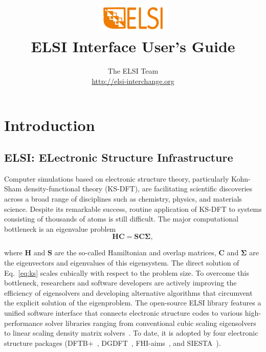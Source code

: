 \documentclass{report}
\begin{document}
\title{\includegraphics[scale=0.07]{elsi_logo.png}\\ \vspace{0.5cm} \textbf{ELSI Interface User's Guide}}
\author{The ELSI Team\\ \url{http://elsi-interchange.org}}
\maketitle

\tableofcontents

\chapter{Introduction}
\section{ELSI: ELectronic Structure Infrastructure}
\label{sec:elsi}
Computer simulations based on electronic structure theory, particularly Kohn-Sham density-functional theory (KS-DFT), are facilitating scientific discoveries across a broad range of disciplines such as chemistry, physics, and materials science. Despite its remarkable success, routine application of KS-DFT to systems consisting of thousands of atoms is still difficult. The major computational bottleneck is an eigenvalue problem
\begin{equation}
\label{eq:ks}
\boldsymbol{H} \boldsymbol{C} = \boldsymbol{S} \boldsymbol{C} \boldsymbol{\Sigma},
\end{equation}

where $\boldsymbol{H}$ and $\boldsymbol{S}$ are the so-called Hamiltonian and overlap matrices, $\boldsymbol{C}$ and $\boldsymbol{\Sigma}$ are the eigenvectors and eigenvalues of this eigensystem. The direct solution of Eq.~\ref{eq:ks} scales cubically with respect to the problem size. To overcome this bottleneck, researchers and software developers are actively improving the efficiency of eigensolvers and developing alternative algorithms that circumvent the explicit solution of the eigenproblem. The open-source ELSI library features a unified software interface that connects electronic structure codes to various high-performance solver libraries ranging from conventional cubic scaling eigensolvers to linear scaling density matrix solvers~\cite{elsi_yu_2018}. To date, it is adopted by four electronic structure packages (DFTB+~\cite{dftb_aradi_2007}, DGDFT~\cite{dgdft_hu_2015}, FHI-aims~\cite{fhiaims_blum_2009}, and SIESTA~\cite{siesta_soler_2002}).
\end{document}
